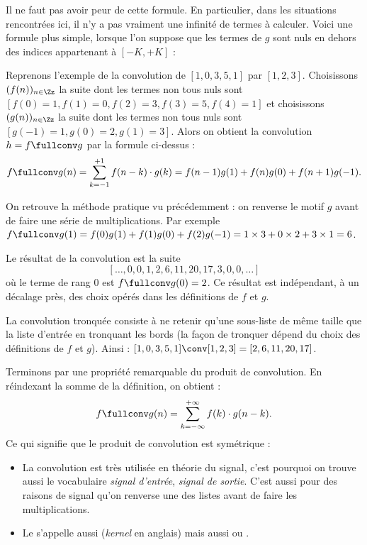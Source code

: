 \documentclass[11pt,class=report,crop=false]{standalone}
\begin{document}
Il ne faut pas avoir peur de cette formule. En particulier, dans les situations rencontrées ici, il n'y a pas vraiment une infinité de termes à calculer. Voici une formule plus simple, lorsque l'on suppose que les termes de $g$ sont nuls en dehors des indices appartenant à $[-K,+K]$ :



Reprenons l'exemple de la convolution de $[1,0,3,5,1]$ par $[1,2,3]$.
Choisissons $(f(n))_{n\in\Zz}$  la suite dont les termes non tous nuls sont $[f(0)=1,f(1)=0,f(2)=3,f(3)=5,f(4)=1]$
et choisissons $(g(n))_{n\in\Zz}$ la suite dont les termes non tous nuls sont $[g(-1)=1,g(0)=2,g(1)=3]$. 
Alors on obtient la convolution $h = f \fullconv g$ par la formule ci-dessus : 
$$f \fullconv g (n) = \sum_{k=-1}^{+1} f(n-k) \cdot g(k) = f(n-1)g(1) + f(n)g(0) +f(n+1)g(-1).$$

On retrouve la méthode pratique vu précédemment : on renverse le motif $g$ avant de faire une série de multiplications.
Par exemple $f \fullconv g (1) = f(0)g(1) + f(1)g(0) +f(2)g(-1) = 1\times 3 + 0\times2 + 3\times 1=6$.
 


Le résultat de la convolution est la suite 
$$[ \ldots, 0, 0, 1,  2,  6, 11, 20, 17,  3, 0 , 0, \ldots]$$
où le terme de rang $0$ est $f \fullconv g(0) = 2$. Ce résultat est indépendant, à un décalage près, des choix opérés dans les définitions de $f$ et $g$.


La convolution tronquée consiste à ne retenir qu'une sous-liste de même taille que la liste d'entrée en tronquant les bords (la façon de tronquer dépend du choix des définitions de $f$ et $g$). Ainsi : 
$[1,0,3,5,1] \conv [1,2,3]= [2,  6, 11, 20, 17]$.



Terminons par une propriété remarquable du produit de convolution.
En réindexant la somme de la définition, on obtient :
$$f \fullconv g(n) = \sum_{k=-\infty}^{+\infty} f(k) \cdot g(n-k).$$
Ce qui signifie que le produit de convolution est symétrique : 


\begin{remarque*}
\sauteligne
\begin{itemize}
  \item La convolution est très utilisée en théorie du signal, c'est pourquoi on trouve aussi le vocabulaire \emph{signal d'entrée}, \emph{signal de sortie}. C'est aussi pour des raisons de signal qu'on renverse une des listes avant de faire les multiplications.
  
  \item Le  s'appelle aussi  (\emph{kernel} en anglais) mais aussi  ou .
\end{itemize}
\end{remarque*}
\end{document}
